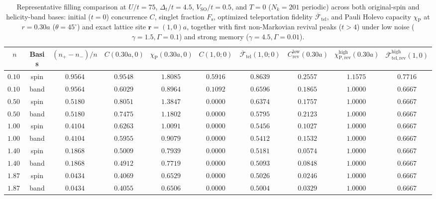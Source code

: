 \documentclass[aps,prb,twocolumn,superscriptaddress,longbibliography]{revtex4-2}
\begin{document}
\begin{table}[t]
    \centering
    \footnotesize
    \caption{Representative filling comparison at $U/t=75$, $\Delta_t/t=4.5$,
    $V_{\mathrm{SO}}/t=0.5$, and $T=0$ ($N_k=201$ periodic) across both
    original-spin and helicity-band bases: initial ($t=0$) concurrence $C$,
    singlet fraction $F_{\mathrm{s}}$, optimized teleportation fidelity
    $\overline{\mathcal{F}}_{\mathrm{tel}}$, and Pauli Holevo capacity
    $\chi_{\mathrm{P}}$ at $r=0.30a$ ($\theta=45^\circ$) and exact lattice
    site $\mathbf{r}=(1,0)a$, together with first non-Markovian revival peaks
    ($t>4$) under low noise ($\gamma=1.5,\Gamma=0.1$) and strong memory
    ($\gamma=4.5,\Gamma=0.01$).}
    \label{tab:n_protocols}
    \begin{ruledtabular}
    \begin{tabular}{cccccccccc}
        $n$ & Basis & $(n_+-n_-)/n$ & $C(0.30a,0)$ & $\chi_{\mathrm{P}}(0.30a,0)$ &
        $C(1,0;0)$ & $\overline{\mathcal{F}}_{\mathrm{tel}}(1,0;0)$ &
        $C_{\mathrm{rev}}^{\mathrm{low}}(0.30a)$ &
        $\chi_{\mathrm{P,rev}}^{\mathrm{high}}(0.30a)$ &
        $\overline{\mathcal{F}}_{\mathrm{tel,rev}}^{\mathrm{high}}(1,0)$ \\
        \hline
        $0.100$ & spin & $0.9564$ & $0.9548$ & $1.8085$ & $0.5916$ & $0.8639$ & $0.2557$ & $1.1575$ & $0.7716$ \\
        $0.100$ & band & $0.9564$ & $0.6029$ & $0.8964$ & $0.1092$ & $0.6596$ & $0.1865$ & $1.0000$ & $0.6667$ \\
        $0.500$ & spin & $0.5180$ & $0.8051$ & $1.3847$ & $0.0000$ & $0.6374$ & $0.1757$ & $1.0000$ & $0.6667$ \\
        $0.500$ & band & $0.5180$ & $0.7475$ & $1.1802$ & $0.0000$ & $0.5795$ & $0.2123$ & $1.0000$ & $0.6667$ \\
        $1.000$ & spin & $0.4104$ & $0.6263$ & $1.0091$ & $0.0000$ & $0.5456$ & $0.1027$ & $1.0000$ & $0.6667$ \\
        $1.000$ & band & $0.4104$ & $0.5955$ & $0.9079$ & $0.0000$ & $0.5412$ & $0.1532$ & $1.0000$ & $0.6667$ \\
        $1.400$ & spin & $0.1868$ & $0.5009$ & $0.7939$ & $0.0000$ & $0.5181$ & $0.0574$ & $1.0000$ & $0.6667$ \\
        $1.400$ & band & $0.1868$ & $0.4912$ & $0.7719$ & $0.0000$ & $0.5093$ & $0.0848$ & $1.0000$ & $0.6667$ \\
        $1.875$ & spin & $0.0434$ & $0.4069$ & $0.6529$ & $0.0000$ & $0.5026$ & $0.0246$ & $1.0000$ & $0.6667$ \\
        $1.875$ & band & $0.0434$ & $0.4055$ & $0.6506$ & $0.0000$ & $0.5004$ & $0.0329$ & $1.0000$ & $0.6667$ \\
    \end{tabular}
    \end{ruledtabular}
\end{table}
\end{document}
